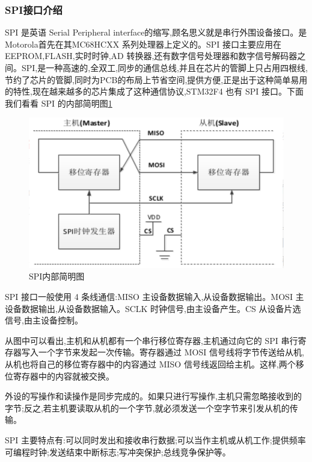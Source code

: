 \documentclass[UTF8]{ctexart}
\begin{document}
\subsubsection{SPI接口介绍}
SPI 是英语 Serial Peripheral interface的缩写,顾名思义就是串行外围设备接口。是Motorola首先在其MC68HCXX 系列处理器上定义的。SPI 接口主要应用在 EEPROM,FLASH,实时时钟,AD 转换器,还有数字信号处理器和数字信号解码器之间。SPI,是一种高速的,全双工,同步的通信总线,并且在芯片的管脚上只占用四根线,节约了芯片的管脚,同时为PCB的布局上节省空间,提供方便,正是出于这种简单易用的特性,现在越来越多的芯片集成了这种通信协议,STM32F4 也有 SPI 接口。下面我们看看 SPI 的内部简明图\ref{b}
\begin{figure}[h]
	\centering
	\includegraphics[scale = 0.5]{3}
	\caption{SPI内部简明图}
	\label{b}
\end{figure}
SPI 接口一般使用 4 条线通信:MISO 主设备数据输入,从设备数据输出。MOSI 主设备数据输出,从设备数据输入。SCLK 时钟信号,由主设备产生。CS 从设备片选信号,由主设备控制。

从图中可以看出,主机和从机都有一个串行移位寄存器,主机通过向它的 SPI 串行寄存器写入一个字节来发起一次传输。寄存器通过 MOSI 信号线将字节传送给从机,从机也将自己的移位寄存器中的内容通过 MISO 信号线返回给主机。这样,两个移位寄存器中的内容就被交换。

外设的写操作和读操作是同步完成的。如果只进行写操作,主机只需忽略接收到的字节;反之,若主机要读取从机的一个字节,就必须发送一个空字节来引发从机的传输。

SPI 主要特点有:可以同时发出和接收串行数据;可以当作主机或从机工作;提供频率可编程时钟;发送结束中断标志;写冲突保护;总线竞争保护等。
\end{document}
